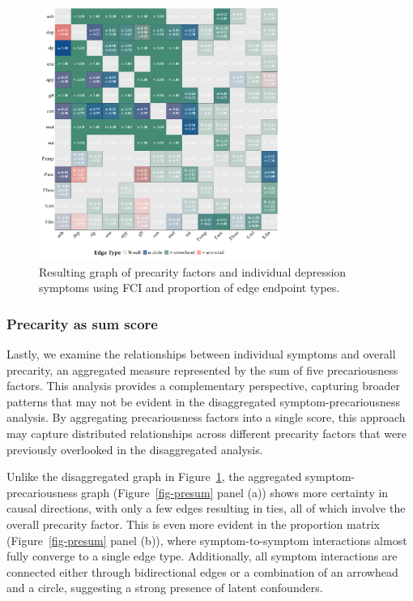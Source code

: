 \documentclass[
]{article}
\begin{document}
\begin{figure}
\begin{minipage}{\linewidth}
{\includegraphics[width=0.7\textwidth,height=\textheight]{img/symptom_mat_fci.pdf}

}


\end{minipage}%

\caption{\label{fig-sym}Resulting graph of precarity factors and
individual depression symptoms using FCI and proportion of edge endpoint
types.}

\end{figure}%

\subsubsection{Precarity as sum score}\label{precarity-as-sum-score}

Lastly, we examine the relationships between individual symptoms and
overall precarity, an aggregated measure represented by the sum of five
precariousness factors. This analysis provides a complementary
perspective, capturing broader patterns that may not be evident in the
disaggregated symptom-precariousness analysis. By aggregating
precariousness factors into a single score, this approach may capture
distributed relationships across different precarity factors that were
previously overlooked in the disaggregated analysis.

Unlike the disaggregated graph in Figure~\ref{fig-sym}, the aggregated
symptom-precariousness graph (Figure~\ref{fig-presum} panel (a)) shows
more certainty in causal directions, with only a few edges resulting in
ties, all of which involve the overall precarity factor. This is even
more evident in the proportion matrix (Figure~\ref{fig-presum} panel
(b)), where symptom-to-symptom interactions almost fully converge to a
single edge type. Additionally, all symptom interactions are connected
either through bidirectional edges or a combination of an arrowhead and
a circle, suggesting a strong presence of latent confounders.
\end{document}
